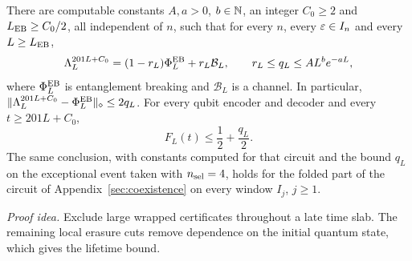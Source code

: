 \begin{theorem}\label{u:eb}
There are computable constants \(A,a>0\), \(b\in\mathbb N\), an integer \(C_0\ge2\)
and \(L_{\rm EB}\ge C_0/2\), all independent of \(n\), such that for every \(n\), every
\(\varepsilon\in I_n\) and every \(L\ge L_{\rm EB}\),
\begin{equation}\label{eq:u-eb}
 \Lambda_L^{201L+C_0}=(1-r_L)\Phi^{\rm EB}_L+r_L\mathcal B_L,
 \qquad r_L\le q_L\le A L^b e^{-aL},
\end{equation}
where \(\Phi^{\rm EB}_L\) is entanglement breaking and
\(\mathcal B_L\) is a channel. In particular,
\(\|\Lambda_L^{201L+C_0}-\Phi^{\rm EB}_L\|_\diamond\le2q_L\). For every qubit
encoder and decoder and every \(t\ge201L+C_0\),
\begin{equation}\label{eq:u-fidelity}
 F_L(t)\le\frac12+\frac{q_L}{2}.
\end{equation}
The same conclusion, with constants computed for that circuit and the
bound \(q_L\) on the exceptional event taken with \(n_{\rm sel}=4\),
holds for the folded part of the circuit of
Appendix~\ref{sec:coexistence} on every window \(I_j\), \(j\ge1\).
\end{theorem}
\par\noindent\emph{Proof idea.} Exclude large wrapped certificates throughout a late time slab. The remaining local erasure cuts remove dependence on the initial quantum state, which gives the lifetime bound.

